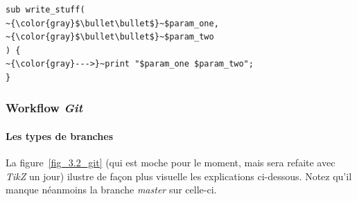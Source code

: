\begin{lstlisting}[basicstyle=\normalsize, caption={Conventions de code}, label=fig_3.1_conventions]
sub write_stuff(
~{\color{gray}$\bullet\bullet$}~$param_one,
~{\color{gray}$\bullet\bullet$}~$param_two
) {
~{\color{gray}--->}~print "$param_one $param_two";
}
\end{lstlisting}

\subsubsection{Workflow \emph{Git}}

\paragraph{Les types de branches}
La figure~\ref{fig_3.2_git} (qui est moche pour le moment, mais sera refaite avec \emph{TikZ} un jour) ilustre de façon plus visuelle les explications ci-dessous.
Notez qu'il manque néanmoins la branche \emph{master} sur celle-ci.

